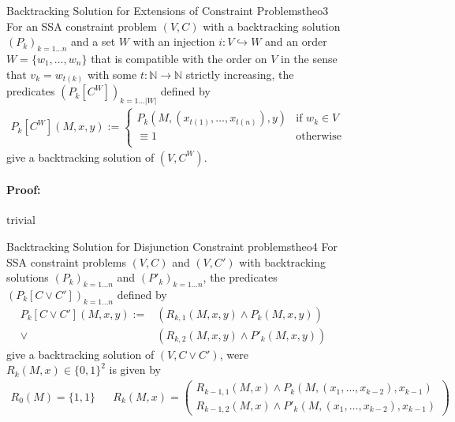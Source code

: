 \begin{figure}[p]
    \begin{theorem}{Backtracking Solution for Extensions of Constraint Problems}{theo3}
        For an SSA constraint problem $(V,C)$ with a backtracking
        solution $(P_k)_{k=1\dots n}$ and a set $W$ with an injection
        $i:V\hookrightarrow W$ and an order $W=\{w_1,\dots,w_n\}$ that is
        compatible with the order on $V$ in the sense that $v_k=w_{t(k)}$ with
        some $t:\mathbb N\rightarrow\mathbb N$ strictly increasing, the
        predicates $(P_k[C^W])_{k=1\dots |W|}$ defined by
        \begin{align*}
            P_k[C^W](M,x,y):=\left\{
                \begin{array}{ll}
                    P_k\left(M,\left(x_{t(1)},\dots,x_{t(n)}\right),y\right)&\text{if }w_k\in V\\
                    \equiv 1&\text{otherwise}\\
                \end{array}\right.
        \end{align*}
        give a backtracking solution of $(V,C^W)$.
        \tcblower
        \paragraph*{Proof:} trivial
    \end{theorem}
    \begin{theorem}{Backtracking Solution for Disjunction Constraint problems}{theo4}
        For SSA constraint problems $(V,C)$ and $(V,C')$ with backtracking
        solutions $(P_k)_{k=1\dots n}$ and $(P'_k)_{k=1\dots n}$, the
        predicates $(P_k[C\mathrel\lor C'])_{k=1\dots n}$ defined by
        \begin{align*}
            P_k[C\mathrel\lor C'](M,x,y):={}&\left(R_{k,1}(M,x,y)\mathrel\land P_k(M,x,y)\right)\\
                              \mathrel\lor{}&\left(R_{k,2}(M,x,y)\mathrel\land P'_k(M,x,y)\right)
        \end{align*}
        give a backtracking solution of $(V,C\mathrel\lor C')$, were $R_k(M,x)\in\{0,1\}^2$
        is given by 
        \begin{align*}
            R_0(M)=\{1,1\}&&
            R_k(M,x)=\left(
                \begin{array}{l}
                    R_{k-1,1}(M,x)\mathrel\land P_k(M,(x_1,\dots,x_{k-2}),x_{k-1})\\
                    R_{k-1,2}(M,x)\mathrel\land P'_k(M,(x_1,\dots,x_{k-2}),x_{k-1})
                \end{array}\right)
        \end{align*}
        \tcblower

\end{theorem}
\end{figure}
